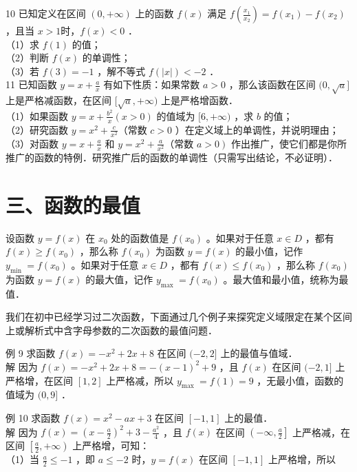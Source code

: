 \documentclass[10pt]{article}
\begin{document}
10 已知定义在区间 \((0,+\infty)\) 上的函数 \(f(x)\) 满足 \(f\left(\frac{x_{1}}{x_{2}}\right)=f\left(x_{1}\right)-f\left(x_{2}\right)\) ，且当 \(x>1\)时，\(f(x)<0\) ．\\
（1）求 \(f(1)\) 的值；\\
（2）判断 \(f(x)\) 的单调性；\\
（3）若 \(f(3)=-1\) ，解不等式 \(f(|x|)<-2\) ．\\
11 已知函数 \(y=x+\frac{a}{x}\) 有如下性质：如果常数 \(a>0\) ，那么该函数在区间 \((0, \sqrt{a}]\) 上是严格减函数，在区间 \([\sqrt{a},+\infty)\) 上是严格增函数．\\
（1）如果函数 \(y=x+\frac{b^{2}}{x}(x>0)\) 的值域为 \([6,+\infty)\) ，求 \(b\) 的值；\\
（2）研究函数 \(y=x^{2}+\frac{c}{x^{2}}\)（常数 \(c>0\) ）在定义域上的单调性，并说明理由；\\
（3）对函数 \(y=x+\frac{a}{x}\) 和 \(y=x^{2}+\frac{a}{x^{2}}\)（常数 \(\left.a>0\right)\) 作出推广，使它们都是你所推广的函数的特例．研究推广后的函数的单调性（只需写出结论，不必证明）．

\section*{三、函数的最值}
设函数 \(y=f(x)\) 在 \(x_{0}\) 处的函数值是 \(f\left(x_{0}\right)\) 。如果对于任意 \(x \in D\) ，都有 \(f(x) \geqslant f\left(x_{0}\right)\) ，那么称 \(f\left(x_{0}\right)\) 为函数 \(y=f(x)\) 的最小值，记作 \(y_{\text {min }}=f\left(x_{0}\right)\) 。如果对于任意 \(x \in D\) ，都有 \(f(x) \leqslant f\left(x_{0}\right)\) ，那么称 \(f\left(x_{0}\right)\) 为函数 \(y=f(x)\) 的最大值，记作 \(y_{\text {max }}=f\left(x_{0}\right)\) 。最大值和最小值，统称为最值．

我们在初中已经学习过二次函数，下面通过几个例子来探究定义域限定在某个区间上或解析式中含字母参数的二次函数的最值问题．

例 9 求函数 \(f(x)=-x^{2}+2 x+8\) 在区间 \((-2,2]\) 上的最值与值域．\\
解 因为 \(f(x)=-x^{2}+2 x+8=-(x-1)^{2}+9\) ，且 \(f(x)\) 在区间 \((-2,1]\) 上严格增，在区间 \([1,2]\) 上严格减，所以 \(y_{\text {max }}=f(1)=9\) ，无最小值，函数的值域为 \((0,9]\) ．

例 10 求函数 \(f(x)=x^{2}-a x+3\) 在区间 \([-1,1]\) 上的最值．\\
解 因为 \(f(x)=\left(x-\frac{a}{2}\right)^{2}+3-\frac{a^{2}}{4}\) ，且 \(f(x)\) 在区间 \(\left(-\infty, \frac{a}{2}\right]\) 上严格减，在区间 \(\left[\frac{a}{2},+\infty\right)\) 上严格增，可知：\\
（1）当 \(\frac{a}{2} \leqslant-1\) ，即 \(a \leqslant-2\) 时，\(y=f(x)\) 在区间 \([-1,1]\) 上严格增，所以
\end{document}
